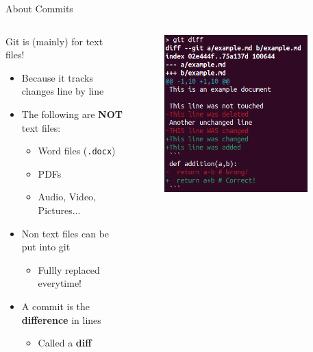 \documentclass[compress,aspectratio=169]{beamer}
\begin{document}
  \begin{frame}{About Commits}
    \begin{columns}
      \begin{column}{0.6\textwidth}
        \begin{block}{Git is (mainly) for text files!}
          \begin{itemize}
            \item Because it tracks changes line by line
            \item The following are \textbf{NOT} text files:
              \begin{itemize}
                \item Word files (\texttt{.docx})
                \item PDFs
                \item Audio, Video, Pictures...
              \end{itemize}
            \item Non text files can be put into git
              \begin{itemize}
                \item Fullly replaced everytime!
              \end{itemize}
            \item A commit is the \textbf{difference} in lines
              \begin{itemize}
                \item Called a \textbf{diff}
              \end{itemize}
          \end{itemize}
        \end{block}
      \end{column}
      \begin{column}{0.4\textwidth}
        \begin{figure}
          \includegraphics[width=0.9\textwidth]{./assets/diff.png}

\end{figure}
\end{column}
\end{columns}
\end{frame}
\end{document}

